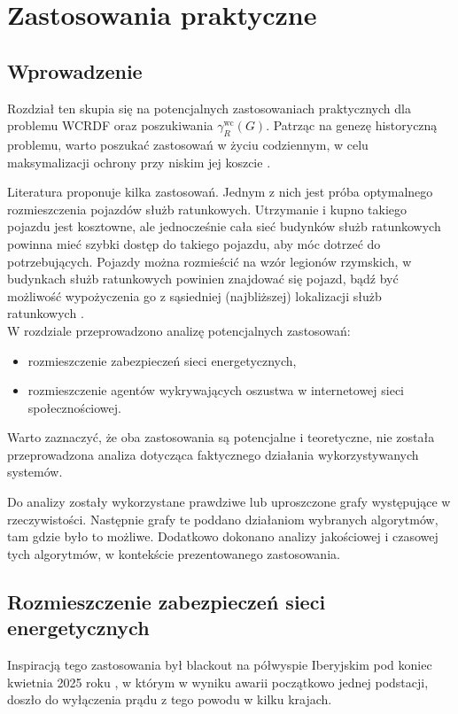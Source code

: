 \chapter{Zastosowania praktyczne}

\section{Wprowadzenie}

Rozdział ten skupia się na potencjalnych zastosowaniach praktycznych dla problemu WCRDF oraz poszukiwania $\gamma^{\text{wc}}_R(G)$. Patrząc na genezę historyczną problemu, warto poszukać zastosowań w życiu codziennym, w celu maksymalizacji ochrony przy niskim jej koszcie \cite{theoryWCRDF}.

Literatura proponuje kilka zastosowań. Jednym z nich jest próba optymalnego rozmieszczenia pojazdów służb ratunkowych. Utrzymanie i kupno takiego pojazdu jest kosztowne, ale jednocześnie cała sieć budynków służb ratunkowych powinna mieć szybki dostęp do takiego pojazdu, aby móc dotrzeć do potrzebujących. Pojazdy można rozmieścić na wzór legionów rzymskich, w budynkach służb ratunkowych powinien znajdować się pojazd, bądź być możliwość wypożyczenia go z sąsiedniej (najbliższej) lokalizacji służb ratunkowych \cite{improvedILP}.\\
W rozdziale przeprowadzono analizę potencjalnych zastosowań:
\begin{itemize}
    \item rozmieszczenie zabezpieczeń sieci energetycznych,
    \item rozmieszczenie agentów wykrywających oszustwa w internetowej sieci
    społecznościowej.
\end{itemize}
Warto zaznaczyć, że oba zastosowania są potencjalne i teoretyczne, nie została przeprowadzona analiza dotycząca faktycznego działania wykorzystywanych systemów.

Do analizy zostały wykorzystane prawdziwe lub uproszczone grafy występujące w rzeczywistości. Następnie grafy te poddano działaniom wybranych algorytmów, tam gdzie było to możliwe. Dodatkowo dokonano analizy jakościowej i czasowej tych algorytmów, w kontekście prezentowanego zastosowania.

\section{Rozmieszczenie zabezpieczeń sieci energetycznych}

Inspiracją tego zastosowania był blackout na półwyspie Iberyjskim pod koniec kwietnia 2025 roku \cite{BLACKOUT}, w którym w wyniku awarii początkowo jednej podstacji, doszło do wyłączenia prądu z tego powodu w kilku krajach.

